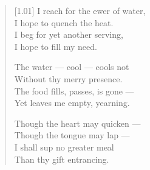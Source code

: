 \begin{verse}[1.01\textwidth]
  I reach for the ewer of water,\\
  I hope to quench the heat.\\
  I beg for yet another serving,\\
  I hope to fill my need.

  The water --- cool --- cools not\\
  Without thy merry presence.\\
  The food fills, passes, is gone ---\\
  Yet leaves me empty, yearning.

  Though the heart may quicken ---\\
  Though the tongue may lap ---\\
  I shall sup no greater meal\\
  Than thy gift entrancing.
\end{verse}
